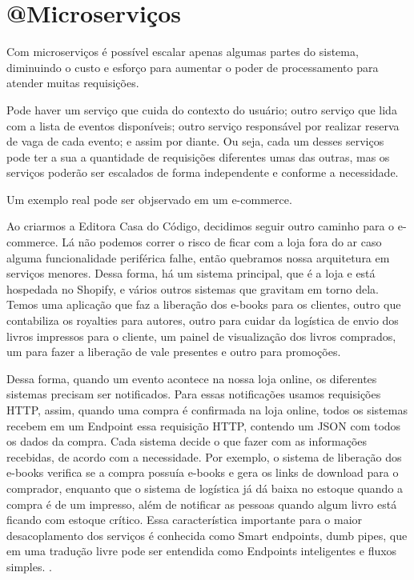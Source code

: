 \chapter{@Microserviços}

%
%



Com microserviços é possível escalar apenas algumas partes do sistema, diminuindo
o custo e esforço para aumentar o poder de processamento para atender muitas requisições.

Pode haver um serviço que cuida do contexto do usuário; outro serviço que lida com a
lista de eventos disponíveis; outro serviço responsável por realizar reserva de vaga de
cada evento; e assim por diante. Ou seja, cada um desses serviços pode ter a sua a quantidade
de requisições diferentes umas das outras, mas os serviços poderão ser escalados de forma
independente e conforme a necessidade.

Um exemplo real pode ser objservado em um e-commerce.

\begin{citacao}

Ao criarmos a Editora Casa do Código, decidimos seguir outro caminho para o e-commerce.
Lá não podemos correr o risco de ficar com a loja fora do ar caso alguma funcionalidade
periférica falhe, então quebramos nossa arquitetura em serviços menores. Dessa forma, há
um sistema principal, que é a loja e está hospedada no Shopify, e vários outros sistemas
que gravitam em torno dela. Temos uma aplicação que faz a liberação dos e-books para os
clientes, outro que contabiliza os royalties para autores, outro para cuidar da logística
de envio dos livros impressos para o cliente, um painel de visualização dos livros comprados,
um para fazer a liberação de vale presentes e outro para promoções.

Dessa forma, quando um evento acontece na nossa loja online, os diferentes sistemas precisam
ser notificados. Para essas notificações usamos requisições HTTP, assim, quando uma compra
é confirmada na loja online, todos os sistemas recebem em um Endpoint essa requisição HTTP,
contendo um JSON com todos os dados da compra. Cada sistema decide o que fazer com as informações
recebidas, de acordo com a necessidade. Por exemplo, o sistema de liberação dos e-books verifica
se a compra possuía e-books e gera os links de download para o comprador, enquanto que o sistema
de logística já dá baixa no estoque quando a compra é de um impresso, além de notificar as pessoas
quando algum livro está ficando com estoque crítico. Essa característica importante para o maior
desacoplamento dos serviços é conhecida como Smart endpoints, dumb pipes, que em uma tradução
livre pode ser entendida como Endpoints inteligentes e fluxos
simples. \cite{arquitetura-de-microservicos-ou-monolitica}.

\end{citacao}


